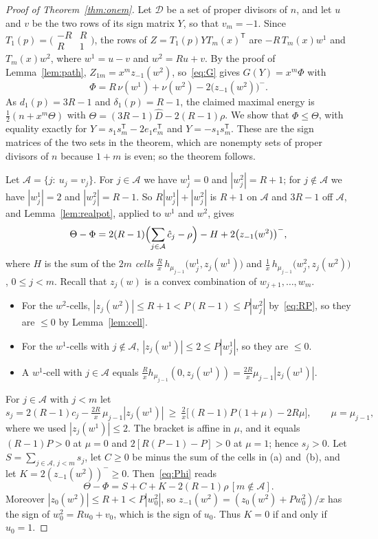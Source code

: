 \documentclass[11pt]{article}
\theoremstyle{remark}
\begin{document}
\begin{proof}[Proof of Theorem~\ref{thm:onem}]
Let $\mathcal D$ be a set of proper divisors of $n$, and let $u$ and $v$ be
the two rows of its sign matrix $Y$, so that $v_m=-1$. Since
$T_1(p)=\bigl(\begin{smallmatrix}-R&R\\R&1\end{smallmatrix}\bigr)$, the rows
of $Z=T_1(p)YT_m(x)^{\mathsf T}$ are $-R\,T_m(x)w^1$ and $T_m(x)w^2$, where
$w^1=u-v$ and $w^2=Ru+v$. By the proof of Lemma~\ref{lem:path},
$Z_{1m}=x^mz_{-1}(w^2)$, so~\eqref{eq:G} gives $G(Y)=x^m\Phi$ with
\[
\Phi=R\,\nu(w^1)+\nu(w^2)-2\bigl(z_{-1}(w^2)\bigr)^-.
\]
As $d_1(p)=3R-1$ and $\delta_1(p)=R-1$, the claimed maximal energy is
$\frac12(n+x^m\Theta)$ with $\Theta=(3R-1)\hat D-2(R-1)\rho$. We show that
$\Phi\le\Theta$, with equality exactly for $Y=s_1s_m^{\mathsf
T}-2e_1e_m^{\mathsf T}$ and $Y=-s_1s_m^{\mathsf T}$. These are the sign
matrices of the two sets in the theorem, which are nonempty sets of proper
divisors of $n$ because $1+m$ is even; so the theorem follows.

Let $\mathcal A=\{j:\ u_j=v_j\}$. For $j\in\mathcal A$ we have $w^1_j=0$ and
$|w^2_j|=R+1$; for $j\notin\mathcal A$ we have $|w^1_j|=2$ and
$|w^2_j|=R-1$. So $R|w^1_j|+|w^2_j|$ is $R+1$ on $\mathcal A$ and $3R-1$ off
$\mathcal A$, and Lemma~\ref{lem:realpot}, applied to $w^1$ and $w^2$, gives
\begin{equation}\label{eq:Phi}
\Theta-\Phi=2(R-1)\Bigl(\sum_{j\in\mathcal A}\hat c_j-\rho\Bigr)-H
+2\bigl(z_{-1}(w^2)\bigr)^-,
\end{equation}
where $H$ is the sum of the $2m$ \emph{cells}
$\frac Rx\,h_{\mu_{j-1}}\bigl(w^1_j,z_j(w^1)\bigr)$ and
$\frac1x\,h_{\mu_{j-1}}\bigl(w^2_j,z_j(w^2)\bigr)$, $0\le j<m$. Recall that
$z_j(w)$ is a convex combination of $w_{j+1},\dots,w_m$.
\begin{itemize}
\item[(a)] For the $w^2$-cells, $|z_j(w^2)|\le R+1<P(R-1)\le P|w^2_j|$
 by~\eqref{eq:RP}, so they are $\le0$ by Lemma~\ref{lem:cell}.
\item[(b)] For the $w^1$-cells with $j\notin\mathcal A$,
 $|z_j(w^1)|\le2\le P|w^1_j|$, so they are $\le0$.
\item[(c)] A $w^1$-cell with $j\in\mathcal A$ equals
 $\frac Rx h_{\mu_{j-1}}(0,z_j(w^1))=\frac{2R}x\mu_{j-1}|z_j(w^1)|$.
\end{itemize}
For $j\in\mathcal A$ with $j<m$ let
\[
s_j=2(R-1)c_j-\tfrac{2R}x\,\mu_{j-1}|z_j(w^1)|
\ \ge\ \tfrac2x\bigl[(R-1)P(1+\mu)-2R\mu\bigr],\qquad \mu=\mu_{j-1},
\]
where we used $|z_j(w^1)|\le2$. The bracket is affine in $\mu$, and it equals
$(R-1)P>0$ at $\mu=0$ and $2[R(P-1)-P]>0$ at $\mu=1$; hence $s_j>0$. Let
$S=\sum_{j\in\mathcal A,\,j<m}s_j$, let $C\ge0$ be minus the sum of the cells
in (a) and~(b), and let $K=2(z_{-1}(w^2))^-\ge0$. Then~\eqref{eq:Phi} reads
\begin{equation}\label{eq:budget}
\Theta-\Phi=S+C+K-2(R-1)\rho\,[m\notin\mathcal A].
\end{equation}
Moreover $|z_0(w^2)|\le R+1<P|w^2_0|$, so $z_{-1}(w^2)=(z_0(w^2)+Pw^2_0)/x$
has the sign of $w^2_0=Ru_0+v_0$, which is the sign of $u_0$. Thus $K=0$ if
and only if $u_0=1$.


\end{proof}
\end{document}
